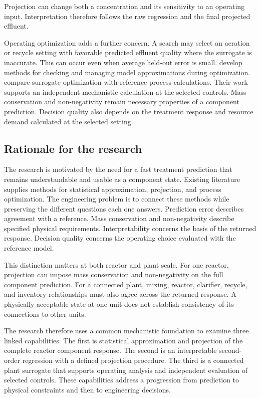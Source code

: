 Projection can change both a concentration and its sensitivity to an operating input. Interpretation therefore follows the raw regression and the final projected effluent.

Operating optimization adds a further concern. A search may select an aeration or recycle setting with favorable predicted effluent quality where the surrogate is inaccurate. This can occur even when average held-out error is small. \citet{Alexandrov1998} develop methods for checking and managing model approximations during optimization. \citet{Pedrozo2025} compare surrogate optimization with reference process calculations. Their work supports an independent mechanistic calculation at the selected controls. Mass conservation and non-negativity remain necessary properties of a component prediction. Decision quality also depends on the treatment response and resource demand calculated at the selected setting.

\subsection{Rationale for the research}

The research is motivated by the need for a fast treatment prediction that remains understandable and usable as a component state. Existing literature supplies methods for statistical approximation, projection, and process optimization. The engineering problem is to connect these methods while preserving the different questions each one answers. Prediction error describes agreement with a reference. Mass conservation and non-negativity describe specified physical requirements. Interpretability concerns the basis of the returned response. Decision quality concerns the operating choice evaluated with the reference model.

This distinction matters at both reactor and plant scale. For one reactor, projection can impose mass conservation and non-negativity on the full component prediction. For a connected plant, mixing, reactor, clarifier, recycle, and inventory relationships must also agree across the returned response. A physically acceptable state at one unit does not establish consistency of its connections to other units.

The research therefore uses a common mechanistic foundation to examine three linked capabilities. The first is statistical approximation and projection of the complete reactor component response. The second is an interpretable second-order regression with a defined projection procedure. The third is a connected plant surrogate that supports operating analysis and independent evaluation of selected controls. These capabilities address a progression from prediction to physical constraints and then to engineering decisions.

